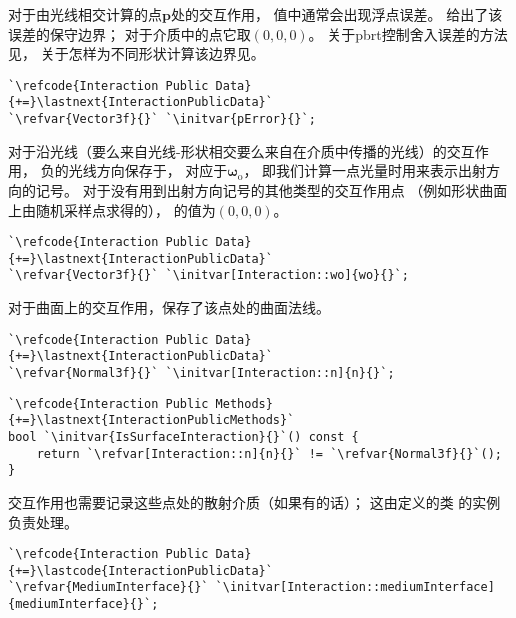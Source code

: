 对于由光线相交计算的点$\bm p$处的交互作用，
值中通常会出现浮点误差。
给出了该误差的保守边界；
对于介质中的点它取$(0,0,0)$。
关于pbrt控制舍入误差的方法见，
关于怎样为不同形状计算该边界见。
\begin{lstlisting}
`\refcode{Interaction Public Data}{+=}\lastnext{InteractionPublicData}`
`\refvar{Vector3f}{}` `\initvar{pError}{}`;
\end{lstlisting}

对于沿光线（要么来自光线-形状相交要么来自在介质中传播的光线）的交互作用，
负的光线方向保存于，
对应于$\bm \omega_{\mathrm{o}}$，
即我们计算一点光量时用来表示出射方向的记号。
对于没有用到出射方向记号的其他类型的交互作用点
（例如形状曲面上由随机采样点求得的），
的值为$(0,0,0)$。
\begin{lstlisting}
`\refcode{Interaction Public Data}{+=}\lastnext{InteractionPublicData}`
`\refvar{Vector3f}{}` `\initvar[Interaction::wo]{wo}{}`;
\end{lstlisting}

对于曲面上的交互作用，保存了该点处的曲面法线。
\begin{lstlisting}
`\refcode{Interaction Public Data}{+=}\lastnext{InteractionPublicData}`
`\refvar{Normal3f}{}` `\initvar[Interaction::n]{n}{}`;
\end{lstlisting}
\begin{lstlisting}
`\refcode{Interaction Public Methods}{+=}\lastnext{InteractionPublicMethods}`
bool `\initvar{IsSurfaceInteraction}{}`() const {
    return `\refvar[Interaction::n]{n}{}` != `\refvar{Normal3f}{}`();
}
\end{lstlisting}

交互作用也需要记录这些点处的散射介质（如果有的话）；
这由定义的类
的实例负责处理。
\begin{lstlisting}
`\refcode{Interaction Public Data}{+=}\lastcode{InteractionPublicData}`
`\refvar{MediumInterface}{}` `\initvar[Interaction::mediumInterface]{mediumInterface}{}`;
\end{lstlisting}

